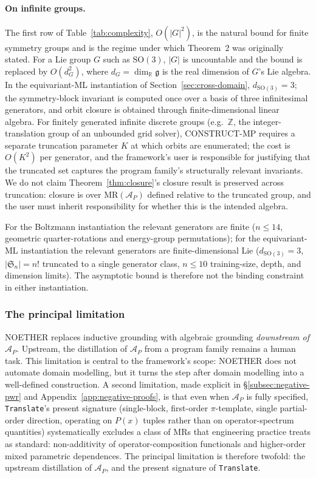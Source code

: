 \documentclass[acmsmall, screen]{acmart}
\begin{document}
\paragraph{On infinite groups.}
\label{subsec:complexity-prose}
The first row of Table~\ref{tab:complexity}, $O(|G|^2)$, is the natural bound for finite symmetry groups and is the regime under which Theorem~2 was originally stated. For a Lie group $G$ such as $\mathrm{SO}(3)$, $|G|$ is uncountable and the bound is replaced by $O(d_G^2)$, where $d_G = \dim_{\mathbb{R}} \mathfrak{g}$ is the real dimension of $G$'s Lie algebra. In the equivariant-ML instantiation of Section~\ref{sec:cross-domain}, $d_{\mathrm{SO}(3)} = 3$; the symmetry-block invariant is computed once over a basis of three infinitesimal generators, and orbit closure is obtained through finite-dimensional linear algebra. For finitely generated infinite discrete groups (e.g.\ $\mathbb{Z}$, the integer-translation group of an unbounded grid solver), CONSTRUCT-MP requires a separate truncation parameter $K$ at which orbits are enumerated; the cost is $O(K^2)$ per generator, and the framework's user is responsible for justifying that the truncated set captures the program family's structurally relevant invariants. We do not claim Theorem~\ref{thm:closure}'s closure result is preserved across truncation: closure is over $\mathrm{MR}(\mathcal{A}_P)$ defined relative to the truncated group, and the user must inherit responsibility for whether this is the intended algebra.

For the Boltzmann instantiation the relevant generators are finite ($n \le 14$, geometric quarter-rotations and energy-group permutations); for the equivariant-ML instantiation the relevant generators are finite-dimensional Lie ($d_{\mathrm{SO}(3)} = 3$, $|\mathfrak{S}_n| = n!$ truncated to a single generator class, $n \le 10$ training-size, depth, and dimension limits). The asymptotic bound is therefore not the binding constraint in either instantiation.

\subsubsection{The principal limitation}

NOETHER replaces inductive grounding with algebraic grounding \emph{downstream of $\mathcal{A}_P$}. Upstream, the distillation of $\mathcal{A}_P$ from a program family remains a human task. This limitation is central to the framework's scope: NOETHER does not automate domain modelling, but it turns the step after domain modelling into a well-defined construction. A second limitation, made explicit in \S\ref{subsec:negative-pwr} and Appendix~\ref{app:negative-proofs}, is that even when $\mathcal{A}_P$ is fully specified, \texttt{Translate}'s present signature (single-block, first-order $\pi$-template, single partial-order direction, operating on $P(x)$ tuples rather than on operator-spectrum quantities) systematically excludes a class of MRs that engineering practice treats as standard: non-additivity of operator-composition functionals and higher-order mixed parametric dependences. The principal limitation is therefore twofold: the upstream distillation of $\mathcal{A}_P$, and the present signature of \texttt{Translate}.
\end{document}
